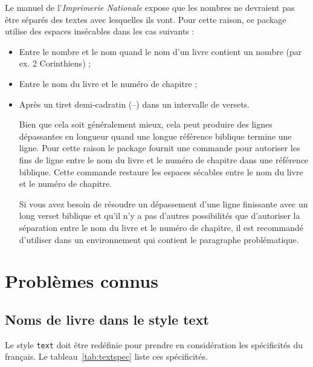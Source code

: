 \documentclass{ltxdoc}
\begin{document}
Le manuel de l'\emph{Imprimerie Nationale} expose que les nombres ne devraient pas être séparés des textes avec lesquelles ils vont. Pour cette raison, ce package utilise des espaces insécables dans les cas suivants :
\begin{itemize}
\item Entre le nombre et le nom quand le nom d'un livre contient un nombre (par ex. 2 Corinthiens) ;
\item Entre le nom du livre et le numéro de chapitre ;
\item Après un tiret demi-cadratin (--) dans un intervalle de versets.

Bien que cela soit généralement mieux, cela peut produire des lignes dépassantes en longueur quand une longue référence biblique termine une ligne.
Pour cette raison le package fournit une commande  pour autoriser les fins de ligne entre le nom du livre et le numéro de chapitre dans une référence biblique.
Cette commande restaure les espaces sécables entre le nom du livre et le numéro de chapitre.

Si vous avez besoin de résoudre un dépassement d'une ligne finissante avec un long verset biblique et qu'il n'y a pas d'autres possibilités que d'autoriser la séparation entre le nom du livre et le numéro de chapitre, il est recommandé d'utiliser  dans un environnement qui contient le paragraphe problématique.

\end{itemize}

\section{Problèmes connus}

\subsection{Noms de livre dans le style  \textsf{text}}

Le style \verb|text| doit être redéfinie pour prendre en considération les spécificités du français. Le tableau~\ref{tab:textspec} liste ces spécificités.
\end{document}
